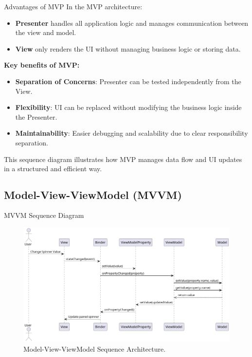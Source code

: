 \documentclass[aspectratio=169, table]{beamer}
\begin{document}
\begin{frame}[fragile]{Advantages of MVP}
	\vspace{20pt}
	In the MVP architecture:
	\begin{itemize}
		\item \textbf{Presenter} handles all application logic and manages communication between the view and model.
		\item \textbf{View} only renders the UI without managing business logic or storing data.
	\end{itemize}
	
	\textbf{Key benefits of MVP:}
	\begin{itemize}
		\item \textbf{Separation of Concerns}: Presenter can be tested independently from the View.
		\item \textbf{Flexibility}: UI can be replaced without modifying the business logic inside the Presenter.
		\item \textbf{Maintainability}: Easier debugging and scalability due to clear responsibility separation.
	\end{itemize}
	
	This sequence diagram illustrates how MVP manages data flow and UI updates in a structured and efficient way.
\end{frame}


\subsection{Model-View-ViewModel (MVVM)}

\begin{frame}[fragile]{MVVM Sequence Diagram}
	\vspace{20pt}
	\begin{figure}[h]
		\centering
		\includegraphics[width=.78\textwidth]{../images/out/mvvm-sequence.png}
		\caption{Model-View-ViewModel Sequence Architecture.}
		\label{fig:mvvm-sequence}
	\end{figure}
\end{frame}
\end{document}
